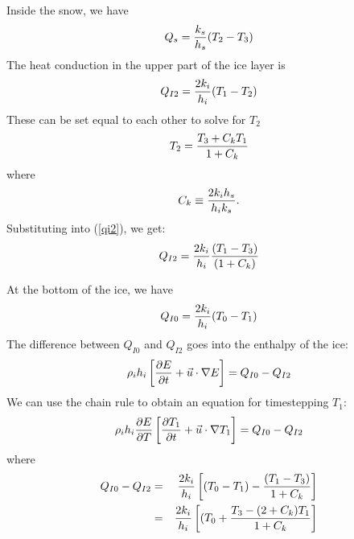 \documentclass[11pt]{article}
\begin{document}
Inside the snow, we have
\begin{equation}
   Q_s = {k_s \over h_s} (T_2 - T_3)
\end{equation}
The heat conduction in the upper part of the ice layer is
\begin{equation}
   Q_{I2} = { 2 k_i \over h_i} (T_1 - T_2)
   \label{qi2}
\end{equation}
These can be set equal to each other to solve for $T_2$
\begin{equation}
   T_2 = {T_3 + C_k T_1 \over 1 + C_k}
\end{equation}
where
$$
  C_k \equiv {2 k_i h_s \over h_i k_s}.
$$
Substituting into (\ref{qi2}), we get:
\begin{equation}
  Q_{I2} = {2k_i \over h_i} {(T_1 - T_3) \over (1 + C_k)}
\end{equation}

At the bottom of the ice, we have
\begin{equation}
  Q_{I0} = {2 k_i \over h_i} (T_0 - T_1)
\end{equation}
The difference between $Q_{I0}$ and $Q_{I2}$ goes into the enthalpy of
the ice:
\begin{equation}
   \rho_i h_i \left[ {\partial E \over \partial t} + \vec{u} \cdot 
   \nabla E \right] = Q_{I0} - Q_{I2}
\end{equation}
We can use the chain rule to obtain an equation for timestepping $T_1$:
\begin{equation}
   \rho_i h_i {\partial E \over \partial T}
   \left[ {\partial T_1 \over \partial t} + \vec{u} \cdot 
   \nabla T_1 \right] = Q_{I0} - Q_{I2}
\end{equation}
where
\begin{eqnarray*}
  Q_{I0} - Q_{I2} & = & {2 k_i \over h_i} \left[ (T_0 - T_1) - 
  {(T_1 - T_3) \over 1 + C_k} \right] \\
	          & = & {2 k_i \over h_i} \left[ (T_0 +
  {T_3 - (2 + C_k) T_1 \over 1 + C_k} \right]
\end{eqnarray*}
\end{document}
